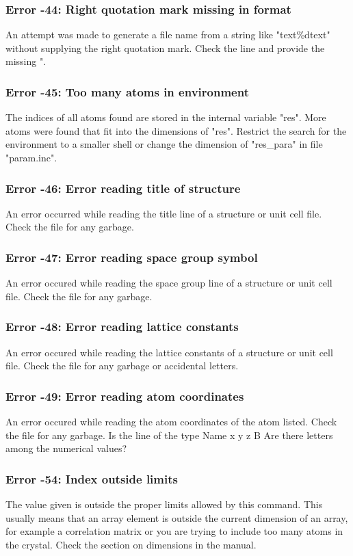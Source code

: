 \subsubsection{Error -44: Right quotation mark missing in format}
\par
An attempt was made to generate a file name from a string like 
"text\%dtext" without supplying the right quotation mark. 
Check the line and provide the missing ". 
\subsubsection{Error -45: Too many atoms in environment}
\par
The indices of all atoms found are stored in the internal variable 
"res". More atoms were found that fit into the dimensions of "res". 
Restrict the search for the environment to a smaller shell or 
change the dimension of "res\_para" in file "param.inc". 
\subsubsection{Error -46: Error reading title of structure}
\par
An error occurred while reading the title line of a structure or 
unit cell file. Check the file for any garbage. 
\subsubsection{Error -47: Error reading space group symbol}
\par
An error occured while reading the space group  line of a structure or 
unit cell file. Check the file for any garbage. 
\subsubsection{Error -48: Error reading lattice constants}
\par
An error occured while reading the lattice constants of a structure 
or unit cell file. Check the file for any garbage or accidental letters. 
\subsubsection{Error -49: Error reading atom coordinates}
\par
An error occured while reading the atom coordinates of the atom 
listed.  Check the file for any garbage. Is the line of the type 
Name x y z B 
Are there letters among the numerical values? 
\subsubsection{Error -54: Index outside limits}
\par
The value given is outside the proper limits allowed by this command. 
This usually means that an array element is outside the current 
dimension of an array, for example a correlation matrix or you are 
trying to include too many atoms in the crystal. Check the section 
on dimensions in the manual. 

